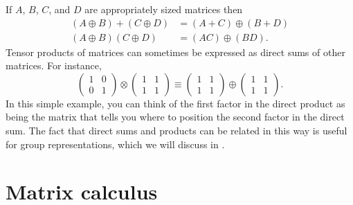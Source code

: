 If $A$, $B$, $C$, and $D$ are appropriately sized matrices then
\begin{equation}\begin{aligned}
(A\oplus B)+(C\oplus D)&=(A+C)\oplus(B+D)\\
(A\oplus B)(C\oplus D)&=(AC)\oplus(BD).
\end{aligned}\end{equation}
Tensor products of matrices can sometimes be expressed
as direct sums of other matrices. For instance,
\begin{equation}
\left(\begin{array}{cc}
1 & 0 \\
0 & 1
\end{array}\right) \otimes\left(\begin{array}{cc}
1 & 1 \\
1 & 1
\end{array}\right) \equiv\left(\begin{array}{cc}
1 & 1 \\
1 & 1
\end{array}\right) \oplus\left(\begin{array}{cc}
1 & 1 \\
1 & 1
\end{array}\right).
\end{equation}
In this simple example, you can think of the first factor
in the direct product as being the matrix that tells you where to position the
second factor in the direct sum. The fact that direct sums and products can be
related in this way is useful for group representations, which we will
discuss in .

\section{Matrix calculus}\label{sec:matrixCalculus} 

